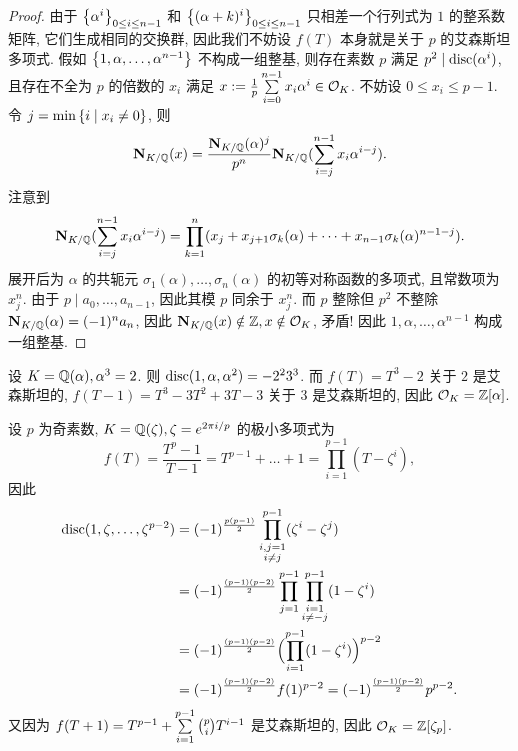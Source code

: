 \begin{proof}
由于 $\left\{\alpha^i\right\}_{0\le i\le n-1}$ 和 $\left\{(\alpha+k)^i\right\}_{0\le i\le n-1}$ 只相差一个行列式为 $1$ 的整系数矩阵, 它们生成相同的交换群, 因此我们不妨设 $f(T)$ 本身就是关于 $p$ 的艾森斯坦多项式.
假如 $\left\{1,\alpha,\dots,\alpha^{n-1}\right\}$ 不构成一组整基, 则存在素数 $p$ 满足 $p^2\mid {\mathrm{disc}}(\alpha^i)$, 且存在不全为 $p$ 的倍数的 $x_i$ 满足 $x:=\frac{1}{p}\sum\limits_{i=0}^{n-1} x_i\alpha^i \in {\mathcal{O}}_K$. 不妨设 $0\le x_i\le p-1$. 令 $j=\min\left\{i\mid x_i\neq 0\right\}$, 则
	\[{\mathbf{N}}_{K/{\mathbb{Q}}}(x)=\frac{{\mathbf{N}}_{K/{\mathbb{Q}}}(\alpha)^j}{p^n}{\mathbf{N}}_{K/{\mathbb{Q}}}(\sum_{i=j}^{n-1}x_i\alpha^{i-j}).\]
注意到
	\[{\mathbf{N}}_{K/{\mathbb{Q}}}(\sum_{i=j}^{n-1}x_i\alpha^{i-j})=\prod_{k=1}^n(x_j+x_{j+1}\sigma_k(\alpha)+\dots+x_{n-1}\sigma_k(\alpha)^{n-1-j}).\]
展开后为 $\alpha$ 的共轭元 $\sigma_1(\alpha),\dots,\sigma_n(\alpha)$ 的初等对称函数的多项式, 且常数项为 $x_j^n$. 由于 $p\mid a_0,\dots,a_{n-1}$, 因此其模 $p$ 同余于 $x_j^n$. 而 $p$ 整除但 $p^2$ 不整除 ${\mathbf{N}}_{K/{\mathbb{Q}}}(\alpha)=(-1)^n a_n$, 因此 ${\mathbf{N}}_{K/{\mathbb{Q}}}(x)\notin{\mathbb{Z}},x\notin {\mathcal{O}}_K$, 矛盾! 因此 $1,\alpha,\dots,\alpha^{n-1}$ 构成一组整基.
\end{proof}

\begin{example}
设 $K={\mathbb{Q}}(\alpha),\alpha^3=2$. 则 ${\mathrm{disc}}(1,\alpha,\alpha^2)=-2^2 3^3$. 而 $f(T)=T^3-2$ 关于 $2$ 是艾森斯坦的, $f(T-1)=T^3-3T^2+3T-3$ 关于 $3$ 是艾森斯坦的, 因此 ${\mathcal{O}}_K={\mathbb{Z}}[\alpha]$.
\end{example}

\begin{example}\label{exe:cyclo_p}
设 $p$ 为奇素数, $K={\mathbb{Q}}(\zeta),\zeta=e^{2\pi i/p}$ 的极小多项式为
	\[f(T)=\frac{T^p-1}{T-1}=T^{p-1}+\dots+1=\prod\limits_{i=1}^{p-1}(T-\zeta^i),\]
因此
\begin{align*}
{\mathrm{disc}}(1,\zeta,\dots,\zeta^{p-2})&=(-1)^{\frac{p(p-1)}{2}}\prod_{\substack{i,j=1\\ i\neq j}}^{p-1}(\zeta^i-\zeta^j)\\
&=(-1)^{\frac{(p-1)(p-2)}{2}}\prod_{j=1}^{p-1}\prod_{\substack{i=1\\ i\neq-j}}^{p-1}(1-\zeta^i)\\
&=(-1)^{\frac{(p-1)(p-2)}{2}}\Bigl(\prod_{i=1}^{p-1}(1-\zeta^i)\Bigr)^{p-2}\\
&=(-1)^{\frac{(p-1)(p-2)}{2}}f(1)^{p-2}=(-1)^{\frac{(p-1)(p-2)}{2}}p^{p-2}.
\end{align*}
又因为 $f(T+1)=T^{p-1}+\sum\limits_{i=1}^{p-1}{p\choose i}T^{i-1}$ 是艾森斯坦的, 因此 ${\mathcal{O}}_K={\mathbb{Z}}[\zeta_p]$.
\end{example}

